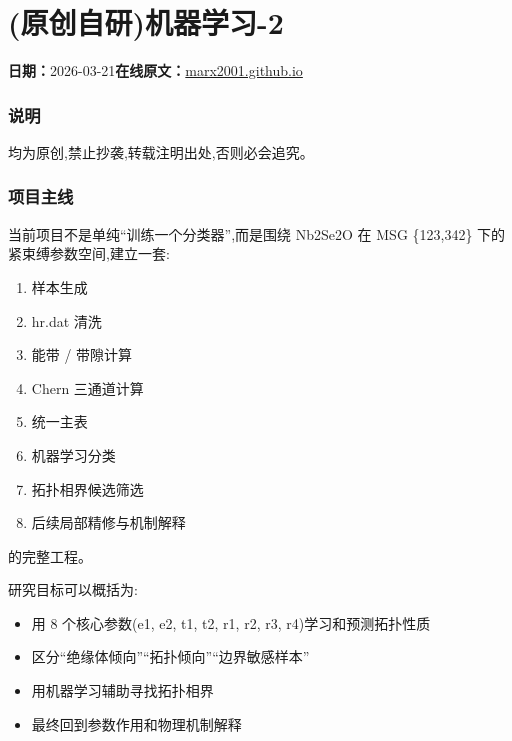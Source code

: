 \documentclass[lang=cn,scheme=chinese,color=blue,device=normal,toc=onecol,math=cm]{elegantbook}
\begin{document}
\section{(原创自研)机器学习-2}
\begin{articlemeta}
\textbf{日期：}2026-03-21\hfill\textbf{在线原文：}\href{https://marx2001.github.io/sci-note\_posts/20260321-ML2}{marx2001.github.io}
\end{articlemeta}

\subsubsection{说明}


均为原创,禁止抄袭,转载注明出处,否则必会追究。\par


\subsubsection{项目主线}


当前项目不是单纯“训练一个分类器”,而是围绕 Nb2Se2O 在 MSG \{123,342\} 下的紧束缚参数空间,建立一套:\par


\begin{enumerate}
\item 样本生成
\item hr.dat 清洗
\item 能带 /\allowbreak{} 带隙计算
\item Chern 三通道计算
\item 统一主表
\item 机器学习分类
\item 拓扑相界候选筛选
\item 后续局部精修与机制解释
\end{enumerate}


的完整工程。\par


研究目标可以概括为:\par


\begin{itemize}
\item 用 8 个核心参数(e1, e2, t1, t2, r1, r2, r3, r4)学习和预测拓扑性质
\item 区分“绝缘体倾向”“拓扑倾向”“边界敏感样本”
\item 用机器学习辅助寻找拓扑相界
\item 最终回到参数作用和物理机制解释
\end{itemize}
\end{document}
